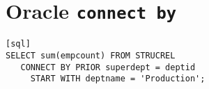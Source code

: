 \section{Oracle \texttt{connect by}}



\begin{verbatim}[sql]
SELECT sum(empcount) FROM STRUCREL
   CONNECT BY PRIOR superdept = deptid
     START WITH deptname = 'Production';
\end{verbatim}
